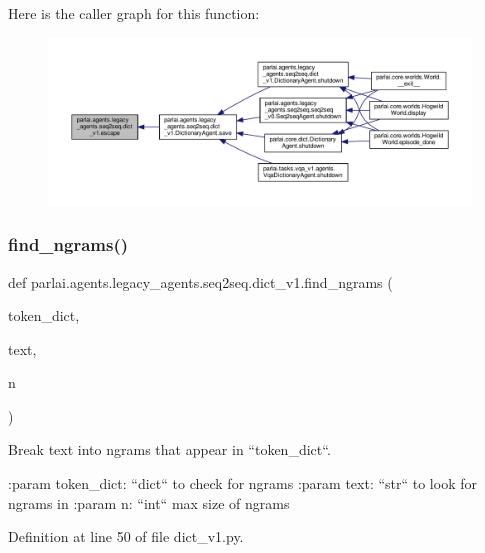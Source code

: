 Here is the caller graph for this function\+:
\nopagebreak
\begin{figure}[H]
\begin{center}
\leavevmode
\includegraphics[width=350pt]{namespaceparlai_1_1agents_1_1legacy__agents_1_1seq2seq_1_1dict__v1_a780f6055b01f2cffa03c670159317ee0_icgraph}
\end{center}
\end{figure}
\mbox{\label{namespaceparlai_1_1agents_1_1legacy__agents_1_1seq2seq_1_1dict__v1_ac37e7654855b4cdf9b8a6cb1a2193a17}} 
\subsubsection{\texorpdfstring{find\+\_\+ngrams()}{find\_ngrams()}}
{\footnotesize\ttfamily def parlai.\+agents.\+legacy\+\_\+agents.\+seq2seq.\+dict\+\_\+v1.\+find\+\_\+ngrams (\begin{DoxyParamCaption}\item[{}]{token\+\_\+dict,  }\item[{}]{text,  }\item[{}]{n }\end{DoxyParamCaption})}

\begin{DoxyVerb}Break text into ngrams that appear in ``token_dict``.

:param token_dict: ``dict`` to check for ngrams
:param text: ``str`` to look for ngrams in
:param n: ``int`` max size of ngrams
\end{DoxyVerb}
 

Definition at line 50 of file dict\+\_\+v1.\+py.



